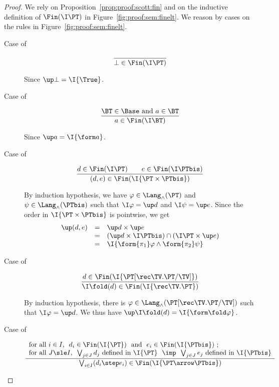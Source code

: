 \begin{proof}
We rely on Proposition~\ref{prop:proof:scott:fin}
and on the inductive definition of $\Fin(\I\PT)$ in Figure~\ref{fig:proof:sem:finelt}.
We reason by cases on the rules 
in Figure~\ref{fig:proof:sem:finelt}.
\begin{description}
\item[Case of]
\[
\dfrac{}
  {\bot \in \Fin(\I\PT)}  
\]

\noindent
Since $\up \bot = \I{\True}$.

\item[Case of]
\[
\dfrac{\text{$\BT \in \Base$ and $a \in \BT$}}
  {a \in \Fin(\I\BT)}
\]

\noindent
Since $\up a = \I{\form a}$.

\item[Case of]
\[
\dfrac{d \in \Fin(\I\PT)
  \qquad
  e \in \Fin(\I\PTbis)}
  {(d,e) \in \Fin(\I{\PT \times \PTbis})}
\]

\noindent
By induction hypothesis, we
have $\varphi \in \Lang_\land(\PT)$
and $\psi \in \Lang_\land(\PTbis)$
such that
$\I\varphi = \up d$
and
$\I\psi = \up e$.
Since the order in $\I{\PT \times \PTbis}$
is pointwise, we get
\[
\begin{array}{l l l}
  \up(d,e)
& =
& \up d \times \up e
\\

& =
& (\up d \times \I\PTbis)
  \cap
  (\I\PT \times \up e)
\\

& =
& \I{\form{\pi_1}\varphi \land \form{\pi_2}\psi}
\end{array}
\]

\item[Case of]
\[
\dfrac{d \in \Fin(\I{\PT[\rec\TV.\PT/\TV]})}
  {\I\fold(d) \in \Fin(\I{\rec\TV.\PT})}
\]

\noindent
By induction hypothesis, there is
$\varphi \in \Lang_\land(\PT[\rec\TV.\PT/\TV])$
such that $\I\varphi = \up d$.
We thus have $\up \I\fold(d) = \I{\form\fold \varphi}$.

\item[Case of]
\[
\dfrac{\begin{array}{l}
  \text{for all $i \in I$,~
  $d_i \in \Fin(\I{\PT})$
  ~and~
  $e_i \in \Fin(\I{\PTbis})$ \@;}
  \\
  \text{for all $J \sle I$,~
  $\bigvee_{j \in J} d_j$ defined in $\I{\PT}$
  ~$\imp$~
  $\bigvee_{j \in J} e_j$ defined in $\I{\PTbis}$}
  \end{array}}
  {\bigvee_{i \in I}(d_i \step e_i) \in \Fin(\I{\PT \arrow \PTbis})}
\]


\end{description}
\end{proof}
